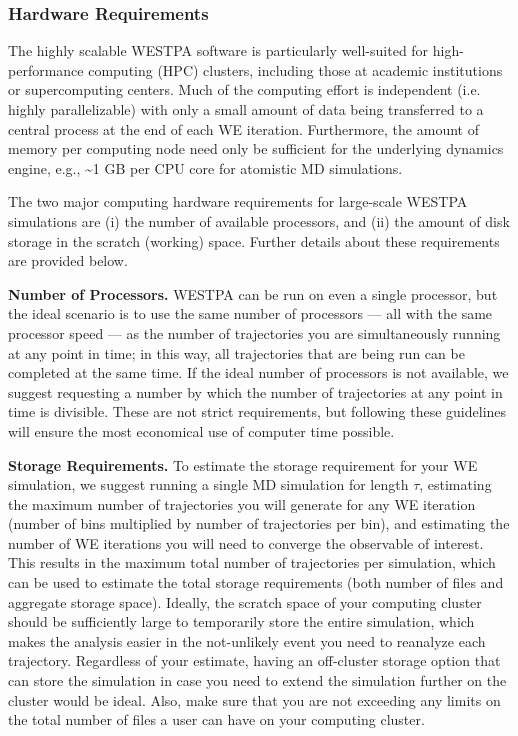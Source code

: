 \documentclass[9pt,tutorial,ASAPversion]{livecoms}
\begin{document}
\subsubsection{Hardware Requirements}

The highly scalable WESTPA software is particularly well-suited for high-performance computing (HPC) clusters, including those at academic institutions or supercomputing centers. 
Much of the computing effort is independent (i.e. highly parallelizable) with only a small amount of data being transferred to a central process at the end of each WE iteration. 
Furthermore, the amount of memory per computing node need only be sufficient for the underlying dynamics engine, e.g., \textasciitilde 1 GB per CPU core for atomistic MD simulations. 

The two major computing hardware requirements for large-scale WESTPA simulations are (i) the number of available processors, and (ii) the amount of disk storage in the scratch (working) space. 
Further details about these requirements are provided below. 

\textbf{Number of Processors.} WESTPA can be run on even a single processor, but the ideal scenario is to use the same number of processors — all with the same processor speed — as the number of trajectories you are simultaneously running at any point in time; in this way, all trajectories that are being run can be completed at the same time. 
If the ideal number of processors is not available, we suggest requesting a number by which the number of trajectories at any point in time is divisible. 
These are not strict requirements, but following these guidelines will ensure the most economical use of computer time possible.

\textbf{Storage Requirements.} To estimate the storage requirement for your WE simulation, we suggest running a single MD simulation for length $\tau$, estimating the maximum number of trajectories you will generate for any WE iteration (number of bins multiplied by number of trajectories per bin), and estimating the number of WE iterations you will need to converge the observable of interest. 
This results in the maximum total number of trajectories per simulation, which can be used to estimate the total storage requirements (both number of files and aggregate storage space). 
Ideally, the scratch space of your computing cluster should be sufficiently large to temporarily store the entire simulation, which makes the analysis easier in the not-unlikely event you need to reanalyze each trajectory. 
Regardless of your estimate, having an off-cluster storage option that can store the simulation in case you need to extend the simulation further on the cluster would be ideal. 
Also, make sure that you are not exceeding any limits on the total number of files a user can have on your computing cluster. 
\end{document}
